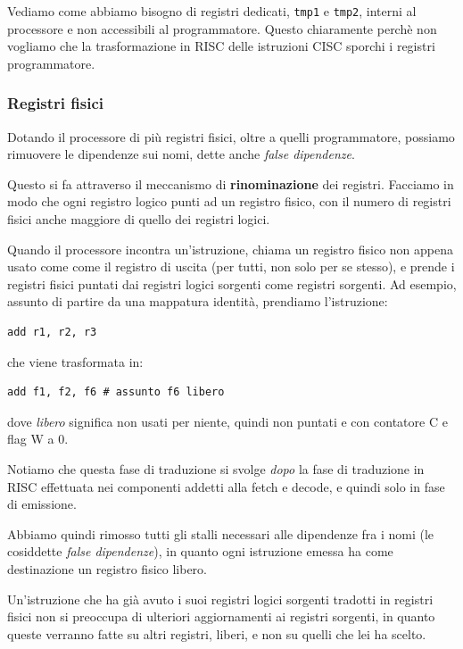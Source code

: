 \documentclass[a4paper,11pt]{article}
\begin{document}
Vediamo come abbiamo bisogno di registri dedicati, \lstinline|tmp1| e \lstinline|tmp2|, interni al processore e non accessibili al programmatore.
Questo chiaramente perchè non vogliamo che la trasformazione in RISC delle istruzioni CISC sporchi i registri programmatore.

\subsubsection{Registri fisici}
Dotando il processore di più registri fisici, oltre a quelli programmatore, possiamo rimuovere le dipendenze sui nomi, dette anche \textit{false dipendenze}. 

Questo si fa attraverso il meccanismo di \textbf{rinominazione} dei registri.
Facciamo in modo che ogni registro logico punti ad un registro fisico, con il numero di registri fisici anche maggiore di quello dei registri logici.

Quando il processore incontra un'istruzione, chiama un registro fisico non appena usato come come il registro di uscita (per tutti, non solo per se stesso), e prende i registri fisici puntati dai registri logici sorgenti come registri sorgenti.
Ad esempio, assunto di partire da una mappatura identità, prendiamo l'istruzione:
\begin{lstlisting}	
add r1, r2, r3
\end{lstlisting}
che viene trasformata in:
\begin{lstlisting}	
add f1, f2, f6 # assunto f6 libero
\end{lstlisting}
dove \textit{libero} significa non usati per niente, quindi non puntati e con contatore C e flag W a 0.

Notiamo che questa fase di traduzione si svolge \textit{dopo} la fase di traduzione in RISC effettuata nei componenti addetti alla fetch e decode, e quindi solo in fase di emissione.

Abbiamo quindi rimosso tutti gli stalli necessari alle dipendenze fra i nomi (le cosiddette \textit{false dipendenze}), in quanto ogni istruzione emessa ha come destinazione un registro fisico libero.

Un'istruzione che ha già avuto i suoi registri logici sorgenti tradotti in registri fisici non si preoccupa di ulteriori aggiornamenti ai registri sorgenti, in quanto queste verranno fatte su altri registri, liberi, e non su quelli che lei ha scelto.

\par \medskip
\end{document}
